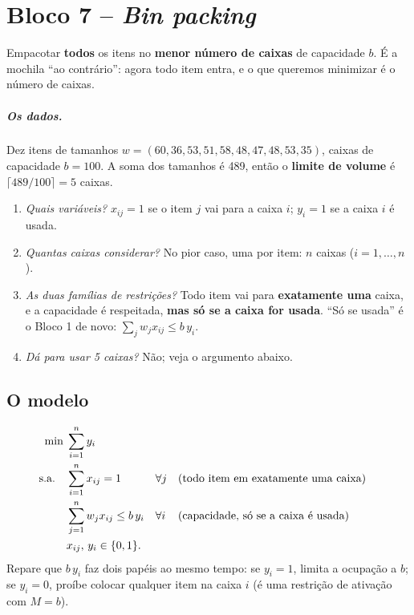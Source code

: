 \chapter{Bloco 7 -- \emph{Bin packing}}
\label{cap:bloco7}

Empacotar \textbf{todos} os itens no \textbf{menor número de caixas} de capacidade $b$. É a mochila ``ao
contrário'': agora todo item entra, e o que queremos minimizar é o número de caixas.

\paragraph{Os dados.} Dez itens de tamanhos $w=(60,36,53,51,58,48,47,48,53,35)$, caixas de capacidade $b=100$. A soma
dos tamanhos é 489, então o \textbf{limite de volume} é $\lceil489/100\rceil=5$ caixas.

\begin{discussao}
\begin{enumerate}
  \item \emph{Quais variáveis?} $x_{ij}=1$ se o item $j$ vai para a caixa $i$; $y_i=1$ se a caixa $i$ é usada.
  \item \emph{Quantas caixas considerar?} No pior caso, uma por item: $n$ caixas ($i=1,\dots,n$).
  \item \emph{As duas famílias de restrições?} Todo item vai para \textbf{exatamente uma} caixa, e a capacidade é
  respeitada, \textbf{mas só se a caixa for usada}. ``Só se usada'' é o Bloco 1 de novo:
  $\sum_jw_jx_{ij}\le b\,y_i$.
  \item \emph{Dá para usar 5 caixas?} Não; veja o argumento abaixo.
\end{enumerate}
\end{discussao}

\section{O modelo}
\[
\begin{aligned}
\min\;& \sum_{i=1}^{n} y_i\\
\text{s.a.}\quad & \sum_{i=1}^{n} x_{ij} = 1 &&\forall j &&\text{(todo item em exatamente uma caixa)}\\
& \sum_{j=1}^{n} w_j x_{ij} \le b\,y_i &&\forall i &&\text{(capacidade, só se a caixa é usada)}\\
& x_{ij},\,y_i\in\{0,1\}.
\end{aligned}
\]
Repare que $b\,y_i$ faz dois papéis ao mesmo tempo: se $y_i=1$, limita a ocupação a $b$; se $y_i=0$, proíbe
colocar qualquer item na caixa $i$ (é uma restrição de ativação com $M=b$).

